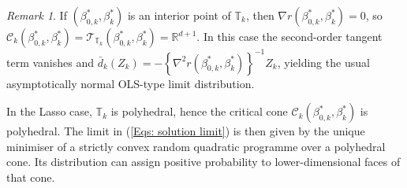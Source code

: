 \documentclass[12pt]{article}
\theoremstyle{remark}
\newtheorem{remark}{Remark}
\theoremstyle{plain}
\begin{document}
\begin{remark}
If $(\beta_{0,k}^{*},\beta_{k}^{*})$ is an interior point of $\mathbb{T}_{k}$, then $\nabla r(\beta_{0,k}^{*},\beta_{k}^{*})=0$, so $\mathcal{C}_{k}(\beta_{0,k}^{*},\beta_{k}^{*})=\mathcal{T}_{\mathbb{T}_{k}}(\beta_{0,k}^{*},\beta_{k}^{*})=\mathbb{R}^{d+1}$. In this case the second-order tangent term vanishes and $\bar{d}_{k}(Z_{k})=-\left\{ \nabla^{2}r(\beta_{0,k}^{*},\beta_{k}^{*})\right\}^{-1}Z_{k}$, yielding the usual asymptotically normal OLS-type limit distribution.

In the Lasso case, $\mathbb{T}_{k}$ is polyhedral, hence the critical cone $\mathcal{C}_{k}(\beta_{0,k}^{*},\beta_{k}^{*})$ is polyhedral. The limit in (\ref{Eqs: solution limit}) is then given by the unique minimiser of a strictly convex random quadratic programme over a polyhedral cone. Its distribution can assign positive probability to lower-dimensional faces of that cone.
\end{remark}
\end{document}
